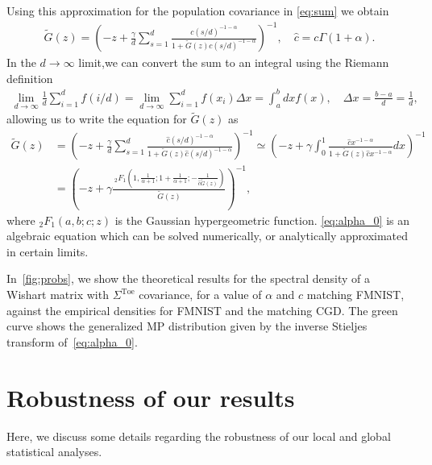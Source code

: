 \documentclass{article}
\begin{document}
Using this approximation for the population covariance in \cref{eq:sum} we obtain
\begin{align}
\label{eq:stiel_gaus}
       \tilde{G}(z)
    =
    \left(
    -z +  \frac{\gamma }{d}
\sum_{s=1}^{d}
\frac{c (s/d)^{-1-\alpha }}{1+ \tilde{G}(z) c (s/d)^{-1-\alpha }}
    \right)^{-1},
        \quad
    \hat{c}= c\Gamma(1+\alpha)
    .
\end{align}
In the $d\to \infty$
limit,we can convert the sum to an integral using the Riemann definition
\begin{align}
    \lim_{d\to\infty}
    \frac{1}{d}\sum_{i=1}^d
    f(i/d) 
    =
    \lim_{d\to\infty}
    \sum_{i=1}^d
    f(x_i) \Delta x
    =
    \int_a^b  dx f(x)
    ,
    \quad
    \Delta x = \frac{b-a}{d}=\frac{1}{d},
\end{align}
allowing us to write the equation for $\tilde{G}(z)$ as
\begin{align}
\label{eq:alpha_0}
       \tilde{G}(z)
    &=
    \left(
    -z +  
    \frac{\gamma }{d}
\sum_{s=1}^{d}
\frac{\hat{c} (s/d)^{-1-\alpha }}{1+ \tilde{G}(z) \hat{c} (s/d)^{-1-\alpha }}
    \right)^{-1}
    \simeq
    \left(
    -z + \gamma 
    \int_0^1
\frac{\hat{c} x^{-1-\alpha }}{1+ \tilde{G}(z) \hat{c} x^{-1-\alpha }}dx
    \right)^{-1}    
    \\ \nonumber
    &=
    \left(
    -z + \gamma 
    \frac{\, _2F_1\left(1,\frac{1}{\alpha +1};1+\frac{1}{\alpha +1};-\frac{1}{\hat{c} \tilde{G}(z)}\right)}{\tilde{G}(z)}
    \right)^{-1}   
    ,
\end{align}
where $_2F_1(a,b;c;z)$ is the Gaussian hypergeometric function. \cref{eq:alpha_0} is an algebraic equation which can be solved numerically, or analytically approximated in certain limits.

In~\cref{fig:probs}, we show the theoretical results for the spectral density of a Wishart matrix with $\Sigma^\mathrm{Toe}$ covariance, for a value of $\alpha$ and $c$ matching FMNIST, against the empirical densities for FMNIST and the matching CGD. The green curve shows the generalized MP distribution given by the inverse Stieljes transform of~\cref{eq:alpha_0}.


\section{Robustness of our results}

Here, we discuss some details regarding the robustness of our local and global statistical analyses.
\end{document}
